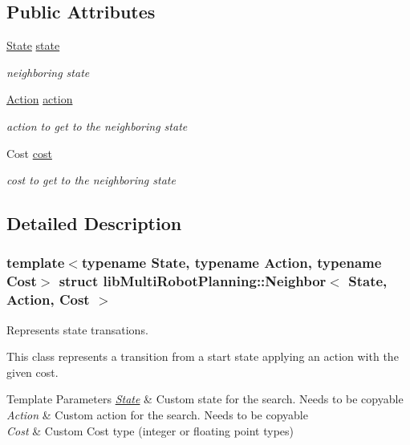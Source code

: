 \subsection*{Public Attributes}
\begin{DoxyCompactItemize}
\item 
\hyperlink{structlib_multi_robot_planning_1_1_state}{State} \hyperlink{structlib_multi_robot_planning_1_1_neighbor_ad4930766ec86e82ae342ffe94f5e0da4}{state}
\begin{DoxyCompactList}\small\item\em neighboring state \end{DoxyCompactList}\item 
\hyperlink{namespacelib_multi_robot_planning_aba73fb71693f86a324adfa0e41e1053d}{Action} \hyperlink{structlib_multi_robot_planning_1_1_neighbor_a8b50ab4edc18e97d809dcd89c42bed44}{action}
\begin{DoxyCompactList}\small\item\em action to get to the neighboring state \end{DoxyCompactList}\item 
Cost \hyperlink{structlib_multi_robot_planning_1_1_neighbor_af269be36c1200896a5990f7ee3d9da27}{cost}
\begin{DoxyCompactList}\small\item\em cost to get to the neighboring state \end{DoxyCompactList}\end{DoxyCompactItemize}


\subsection{Detailed Description}
\subsubsection*{template$<$typename State, typename Action, typename Cost$>$\newline
struct lib\+Multi\+Robot\+Planning\+::\+Neighbor$<$ State, Action, Cost $>$}

Represents state transations. 

This class represents a transition from a start state applying an action with the given cost.


\begin{DoxyTemplParams}{Template Parameters}
{\em \hyperlink{structlib_multi_robot_planning_1_1_state}{State}} & Custom state for the search. Needs to be copy\textquotesingle{}able \\
\hline
{\em Action} & Custom action for the search. Needs to be copy\textquotesingle{}able \\
\hline
{\em Cost} & Custom Cost type (integer or floating point types) \\
\hline
\end{DoxyTemplParams}


